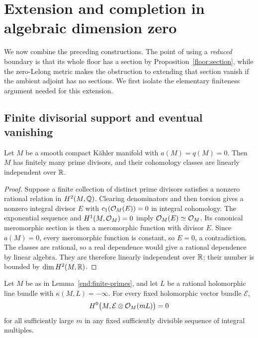 \section{Extension and completion in algebraic dimension zero}
\label{sec:completion}

We now combine the preceding constructions. The point of using a
\emph{reduced} boundary is that its whole floor has a section by
Proposition~\ref{floor:section}, while the zero-Lelong metric makes
the obstruction to extending that section vanish if the ambient
adjoint has no sections. We first isolate the elementary finiteness
argument needed for this extension.

\subsection{Finite divisorial support and eventual vanishing}

\begin{lemma}\label{end:finite-primes}
Let \(M\) be a smooth compact K\"ahler manifold with
\(a(M)=q(M)=0\). Then \(M\) has finitely many prime divisors, and
their cohomology classes are linearly independent over \(\mathbb{R}\).
\end{lemma}

\begin{proof}
Suppose a finite collection of distinct prime divisors satisfies a
nonzero rational relation in \(H^2(M,\mathbb{Q})\). Clearing denominators
and then torsion gives a nonzero integral divisor \(E\) with
\(c_1(\mathcal{O}_M(E))=0\) in integral cohomology. The exponential
sequence and \(H^1(M,\mathcal{O}_M)=0\) imply
\(\mathcal{O}_M(E)\simeq\mathcal{O}_M\). Its canonical meromorphic section is
then a meromorphic function with divisor \(E\). Since \(a(M)=0\),
every meromorphic function is constant, so \(E=0\), a
contradiction. The classes are rational, so a real dependence would
give a rational dependence by linear algebra. They are therefore
linearly independent over \(\mathbb{R}\); their number is bounded by
\(\dim H^2(M,\mathbb{R})\).
\end{proof}

\begin{lemma}\label{end:eventual}
Let \(M\) be as in Lemma~\ref{end:finite-primes}, and let \(L\)
be a rational holomorphic line bundle with \(\kappa(M,L)=-\infty\).
For every fixed holomorphic vector bundle \(\mathcal E\),
\begin{equation}\label{end:fixed-bundle-vanishing}
 H^0\bigl(M,\mathcal E\otimes\mathcal{O}_M(mL)\bigr)=0
\end{equation}
for all sufficiently large \(m\) in any fixed sufficiently divisible
sequence of integral multiples.
\end{lemma}

